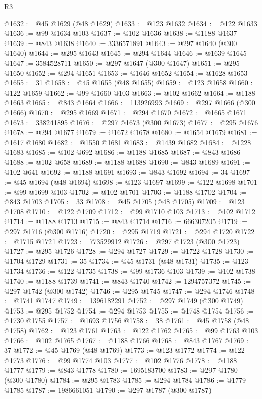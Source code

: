 \begin{lexlean}{R3}
\begin{coremodule}
@1632 := @45 @1629 (@48 @1629)
@1633 := @123 @1632
@1634 := @122 @1633
@1636 := @99 @1634 @103
@1637 := @102 @1636
@1638 := @1188 @1637
@1639 := @843 @1638
@1640 := 3336571891
@1643 := @297 @1640 (@300 @1640)
@1644 := @295 @1643
@1645 := @294 @1644
@1646 := @1639 @1645
@1647 := 3584528711
@1650 := @297 @1647 (@300 @1647)
@1651 := @295 @1650
@1652 := @294 @1651
@1653 := @1646 @1652
@1654 := @1628 @1653
@1655 := 31
@1658 := @45 @1655 (@48 @1655)
@1659 := @123 @1658
@1660 := @122 @1659
@1662 := @99 @1660 @103
@1663 := @102 @1662
@1664 := @1188 @1663
@1665 := @843 @1664
@1666 := 113926993
@1669 := @297 @1666 (@300 @1666)
@1670 := @295 @1669
@1671 := @294 @1670
@1672 := @1665 @1671
@1673 := 338241895
@1676 := @297 @1673 (@300 @1673)
@1677 := @295 @1676
@1678 := @294 @1677
@1679 := @1672 @1678
@1680 := @1654 @1679
@1681 := @1617 @1680
@1682 := @1550 @1681
@1683 := @1439 @1682
@1684 := @1228 @1683
@1685 := @102 @692
@1686 := @1188 @1685
@1687 := @843 @1686
@1688 := @102 @658
@1689 := @1188 @1688
@1690 := @843 @1689
@1691 := @102 @641
@1692 := @1188 @1691
@1693 := @843 @1692
@1694 := 34
@1697 := @45 @1694 (@48 @1694)
@1698 := @123 @1697
@1699 := @122 @1698
@1701 := @99 @1699 @103
@1702 := @102 @1701
@1703 := @1188 @1702
@1704 := @843 @1703
@1705 := 33
@1708 := @45 @1705 (@48 @1705)
@1709 := @123 @1708
@1710 := @122 @1709
@1712 := @99 @1710 @103
@1713 := @102 @1712
@1714 := @1188 @1713
@1715 := @843 @1714
@1716 := 666307205
@1719 := @297 @1716 (@300 @1716)
@1720 := @295 @1719
@1721 := @294 @1720
@1722 := @1715 @1721
@1723 := 773529912
@1726 := @297 @1723 (@300 @1723)
@1727 := @295 @1726
@1728 := @294 @1727
@1729 := @1722 @1728
@1730 := @1704 @1729
@1731 := 35
@1734 := @45 @1731 (@48 @1731)
@1735 := @123 @1734
@1736 := @122 @1735
@1738 := @99 @1736 @103
@1739 := @102 @1738
@1740 := @1188 @1739
@1741 := @843 @1740
@1742 := 1294757372
@1745 := @297 @1742 (@300 @1742)
@1746 := @295 @1745
@1747 := @294 @1746
@1748 := @1741 @1747
@1749 := 1396182291
@1752 := @297 @1749 (@300 @1749)
@1753 := @295 @1752
@1754 := @294 @1753
@1755 := @1748 @1754
@1756 := @1730 @1755
@1757 := @1693 @1756
@1758 := 38
@1761 := @45 @1758 (@48 @1758)
@1762 := @123 @1761
@1763 := @122 @1762
@1765 := @99 @1763 @103
@1766 := @102 @1765
@1767 := @1188 @1766
@1768 := @843 @1767
@1769 := 37
@1772 := @45 @1769 (@48 @1769)
@1773 := @123 @1772
@1774 := @122 @1773
@1776 := @99 @1774 @103
@1777 := @102 @1776
@1778 := @1188 @1777
@1779 := @843 @1778
@1780 := 1695183700
@1783 := @297 @1780 (@300 @1780)
@1784 := @295 @1783
@1785 := @294 @1784
@1786 := @1779 @1785
@1787 := 1986661051
@1790 := @297 @1787 (@300 @1787)

\end{coremodule}
\end{lexlean}
